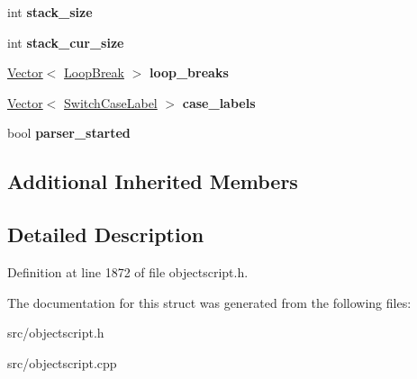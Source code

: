 \begin{DoxyCompactItemize}
\item 
int {\bfseries stack\+\_\+size}\hypertarget{struct_object_script_1_1_o_s_1_1_core_1_1_compiler_1_1_scope_a5dc63c54aa7c9175969c97a1d363e938}{}\label{struct_object_script_1_1_o_s_1_1_core_1_1_compiler_1_1_scope_a5dc63c54aa7c9175969c97a1d363e938}

\item 
int {\bfseries stack\+\_\+cur\+\_\+size}\hypertarget{struct_object_script_1_1_o_s_1_1_core_1_1_compiler_1_1_scope_a10fbadffdae03bea1dbb2e7f63cc813c}{}\label{struct_object_script_1_1_o_s_1_1_core_1_1_compiler_1_1_scope_a10fbadffdae03bea1dbb2e7f63cc813c}

\item 
\hyperlink{struct_object_script_1_1_o_s_1_1_vector}{Vector}$<$ \hyperlink{struct_object_script_1_1_o_s_1_1_core_1_1_compiler_1_1_scope_1_1_loop_break}{Loop\+Break} $>$ {\bfseries loop\+\_\+breaks}\hypertarget{struct_object_script_1_1_o_s_1_1_core_1_1_compiler_1_1_scope_abdc0385d8b4da70ea2d3893e0052a957}{}\label{struct_object_script_1_1_o_s_1_1_core_1_1_compiler_1_1_scope_abdc0385d8b4da70ea2d3893e0052a957}

\item 
\hyperlink{struct_object_script_1_1_o_s_1_1_vector}{Vector}$<$ \hyperlink{struct_object_script_1_1_o_s_1_1_core_1_1_compiler_1_1_scope_1_1_switch_case_label}{Switch\+Case\+Label} $>$ {\bfseries case\+\_\+labels}\hypertarget{struct_object_script_1_1_o_s_1_1_core_1_1_compiler_1_1_scope_a6a812254afac1d52f38f78b920569576}{}\label{struct_object_script_1_1_o_s_1_1_core_1_1_compiler_1_1_scope_a6a812254afac1d52f38f78b920569576}

\item 
bool {\bfseries parser\+\_\+started}\hypertarget{struct_object_script_1_1_o_s_1_1_core_1_1_compiler_1_1_scope_a87376dda01b6850dc93911258221dd0c}{}\label{struct_object_script_1_1_o_s_1_1_core_1_1_compiler_1_1_scope_a87376dda01b6850dc93911258221dd0c}

\end{DoxyCompactItemize}
\subsection*{Additional Inherited Members}


\subsection{Detailed Description}


Definition at line 1872 of file objectscript.\+h.



The documentation for this struct was generated from the following files\+:\begin{DoxyCompactItemize}
\item 
src/objectscript.\+h\item 
src/objectscript.\+cpp\end{DoxyCompactItemize}
